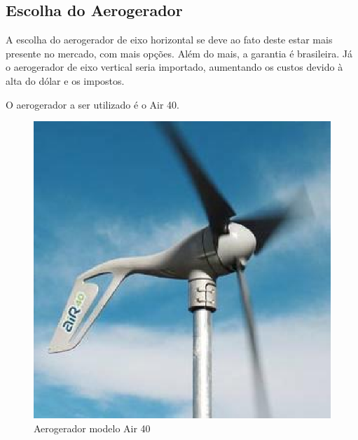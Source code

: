 \newpage



\subsection{Escolha do Aerogerador}

	A escolha do aerogerador de eixo horizontal se deve ao fato deste estar mais presente no mercado, com mais opções. Além do mais, a garantia é brasileira. Já o aerogerador de eixo vertical seria importado, aumentando os custos devido à alta do dólar e os impostos.

	O aerogerador a ser utilizado é o Air 40.

\begin{figure}[H]
  \begin{center}
	\includegraphics[keepaspectratio,scale=0.5]{figuras/air_40.eps}
	\caption{Aerogerador modelo Air 40}
  \end{center}
\end{figure}


